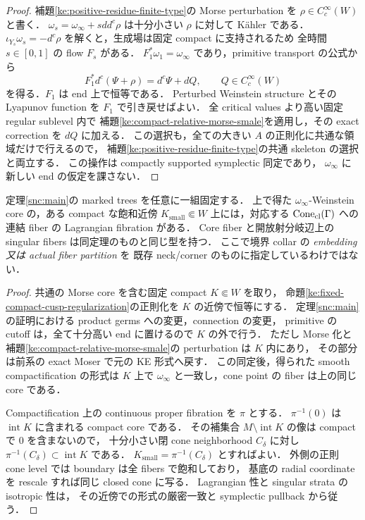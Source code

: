 \begin{proof}
補題\ref{ke:positive-residue-finite-type}の Morse perturbation を
$\rho\in C_c^\infty(W)$ と書く．
$\omega_s=\omega_\infty+sdd^c\rho$ は十分小さい $\rho$ に対して K\"ahler である．
$\iota_{Y_s}\omega_s=-d^c\rho$ を解くと，生成場は固定 compact に支持されるため
全時間 $s\in[0,1]$ の flow $F_s$ がある．
$F_1^*\omega_1=\omega_\infty$ であり，primitive transport の公式から
\[
 F_1^*d^c(\Psi+\rho)=d^c\Psi+dQ,
 \qquad Q\in C_c^\infty(W)
\]
を得る．$F_1$ は end 上で恒等である．
Perturbed Weinstein structure とその Lyapunov function を $F_1$ で引き戻せばよい．
全 critical values より高い固定 regular sublevel 内で
補題\ref{ke:compact-relative-morse-smale}を適用し，その exact correction を $dQ$ に加える．
この選択も，全ての大きい $A$ の正則化に共通な領域だけで行えるので，
補題\ref{ke:positive-residue-finite-type}の共通 skeleton の選択と両立する．
この操作は compactly supported symplectic 同定であり，
$\omega_\infty$ に新しい end の仮定を課さない．
\end{proof}

\begin{corollary}
\label{ke:local-limit-core-filling}
定理\ref{snc:main}の marked trees を任意に一組固定する．
上で得た $\omega_\infty$-Weinstein core の，ある compact な飽和近傍
$K_{\mathrm{small}}\Subset W$ 上には，対応する
$\operatorname{Cone}_{\rm cl}(\Gamma)$ への連結 fiber の Lagrangian fibration がある．
Core fiber と開放射分岐辺上の singular fibers は同定理のものと同じ型を持つ．
ここで境界 collar の \emph{embedding 又は actual fiber partition} を
既存 neck/corner のものに指定しているわけではない．
\end{corollary}

\begin{proof}
共通の Morse core を含む固定 compact $K\Subset W$ を取り，
命題\ref{ke:fixed-compact-cusp-regularization}の正則化を $K$ の近傍で恒等にする．
定理\ref{snc:main}の証明における product germs への変更，connection の変更，
primitive の cutoff は，全て十分高い end に置けるので $K$ の外で行う．
ただし Morse 化と補題\ref{ke:compact-relative-morse-smale}の perturbation は $K$ 内にあり，
その部分は前系の exact Moser で元の KE 形式へ戻す．
この同定後，得られた smooth compactification の形式は $K$ 上で
$\omega_\infty$ と一致し，cone point の fiber は上の同じ core である．

Compactification 上の continuous proper fibration を $\pi$ とする．
$\pi^{-1}(0)$ は $\operatorname{int}K$ に含まれる compact core である．
その補集合 $M\setminus\operatorname{int}K$ の像は compact で $0$ を含まないので，
十分小さい閉 cone neighborhood $C_\delta$ に対し
$\pi^{-1}(C_\delta)\subset\operatorname{int}K$ である．
$K_{\mathrm{small}}=\pi^{-1}(C_\delta)$ とすればよい．
外側の正則 cone level では boundary は全 fibers で飽和しており，
基底の radial coordinate を rescale すれば同じ closed cone に写る．
Lagrangian 性と singular strata の isotropic 性は，
その近傍での形式の厳密一致と symplectic pullback から従う．
\end{proof}

